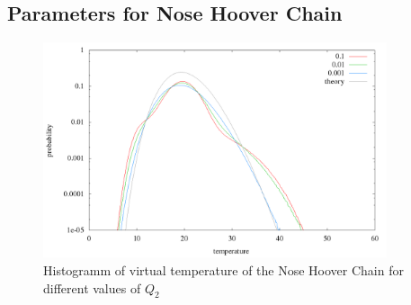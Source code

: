 \subsection{Parameters for Nose Hoover Chain}

\begin{figure}[H]
\centering
\includegraphics[width=0.9\textwidth]{./graphics/Histogramm_tempCol_one_Chain.png}
\caption{Histogramm of virtual temperature of the Nose Hoover Chain for different values of $Q_2$ }
\label{im:temp_one}
\end{figure}



